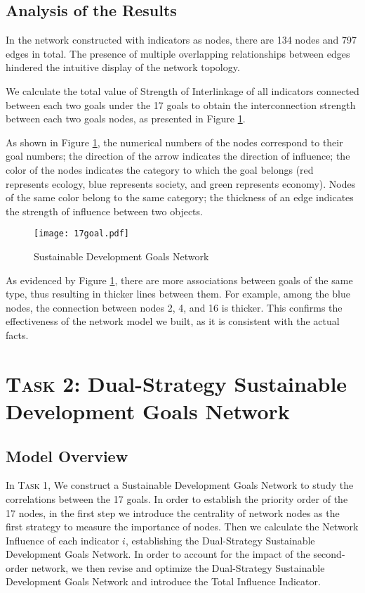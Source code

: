 \documentclass[12pt]{article}  %
\begin{document}
\subsection{Analysis of the Results}

In the network constructed with indicators as nodes, there are 134 nodes and 797 edges in total. The presence of multiple overlapping relationships between edges hindered the intuitive display of the network topology. 

We calculate the total value of  Strength of Interlinkage of all indicators connected between each two goals under the 17 goals to obtain the interconnection strength between each two goals nodes, as presented in Figure \ref{fig:3.2}.


As shown in Figure \ref{fig:3.2}, the numerical numbers of the nodes correspond to their goal numbers; the direction of the arrow indicates the direction of influence; the color of the nodes indicates the category to which the goal belongs (red represents ecology, blue represents society, and green represents economy). Nodes of the same color belong to the same category; the thickness of an edge indicates the strength of influence between two objects.

\begin{figure}[htbp]
\centering
\texttt{[image: 17goal.pdf]}
\caption{Sustainable Development Goals Network }\label{fig:3.2}
\end{figure}
As evidenced by Figure \ref{fig:3.2}, there are more associations between goals of the same type, thus resulting in thicker lines between them. For example, among the blue nodes, the connection between nodes 2, 4, and 16 is thicker. This confirms the effectiveness of the network model we built, as it is consistent with the actual facts.
\section{\textsc{Task 2:} Dual-Strategy Sustainable Development Goals Network}

\subsection{Model Overview}
In \textsc{Task 1}, 
We construct a Sustainable Development Goals Network to study the correlations between the 17 goals. In order to establish the priority order of the 17  nodes, in the first step we introduce the centrality of network nodes as the first strategy to measure the importance of nodes.
Then we calculate the Network Influence  of each  indicator $i$, establishing the  Dual-Strategy Sustainable Development Goals Network. 
In order to account for the impact of the second-order network, we then revise and optimize the Dual-Strategy Sustainable Development Goals Network  and introduce the Total Influence Indicator. 
\end{document}
